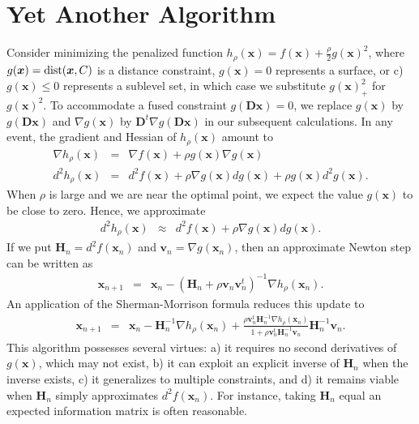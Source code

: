 \documentclass[11pt]{article}
\def\dist{\mathop{\rm dist}\nolimits}
\newcommand{\bv}{\boldsymbol{v}}
\newcommand{\bx}{\boldsymbol{x}}
\newcommand{\bD}{\boldsymbol{D}}
\newcommand{\bH}{\boldsymbol{H}}
\begin{document}
\section*{\center Yet Another Algorithm}

Consider minimizing the penalized function
$h_\rho(\bx)=f(\bx)+\frac{\rho}{2} g(\bx)^2$, where $g(\bx) = \dist(\bx,C)$ is a distance constraint, $g(\bx)=0$ represents a surface, or c) $g(\bx) \le 0$ represents a sublevel set, in which case we substitute $g(\bx)_+^2$ for $g(\bx)^2$. To accommodate a fused constraint $g(\bD\bx)=0$, we replace $g(\bx)$ by $g(\bD\bx)$ and $\nabla g(\bx)$ by $\bD^t \nabla g(\bD\bx)$ in our subsequent calculations. In any event, the gradient and Hessian of $h_\rho(\bx)$ amount to 
\begin{eqnarray*}
\nabla h_\rho(\bx) & = & \nabla f(\bx) 
+\rho g(\bx) \nabla g(\bx) \\
d^2h_\rho(\bx) & = & d^2 f(\bx) +\rho \nabla g(\bx)dg(\bx)
+ \rho g(\bx) d^2g(\bx) .
\end{eqnarray*}
When $\rho$ is large and we are near the optimal point, we expect the value $g(\bx)$ to be close to zero. Hence, we approximate
\begin{eqnarray*}
d^2h_\rho(\bx) & \approx & d^2 f(\bx) +\rho \nabla g(\bx)dg(\bx) .
\end{eqnarray*}
If we put $\bH_n=d^2f(\bx_n)$ and $\bv_n = \nabla g(\bx_n)$, then
an approximate Newton step can be written as  
\begin{eqnarray*}
\bx_{n+1} & = & \bx_n - (\bH_n+\rho \bv_n\bv_n^t)^{-1}
\nabla h_\rho(\bx_n) .
\end{eqnarray*}
An application of the Sherman-Morrison formula reduces this update to
\begin{eqnarray}
\bx_{n+1} & = & \bx_n - \bH_n^{-1}\nabla h_\rho(\bx_n)
+ \frac{\rho\bv_n^t \bH_n^{-1}\nabla h_\rho(\bx_n)  }
{1+\rho \bv_n^t\bH_n^{-1} \bv_n}\bH_n^{-1}\bv_n. \label{newtonlike}
\end{eqnarray}
This algorithm possesses several virtues: a) it requires no
second derivatives of $g(\bx)$, which may not exist, b) it can exploit an explicit inverse of $\bH_n$ when the inverse exists, c) it generalizes to multiple constraints, and d) it remains viable when $\bH_n$ simply approximates $d^2f(\bx_n)$. For instance, taking $\bH_n$ equal an expected information matrix is often reasonable.
\end{document}
